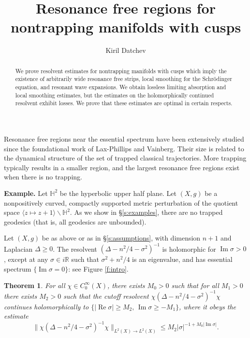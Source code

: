 \documentclass[reqno, 12pt]{amsart}
\title
[Resonance free regions for nontrapping manifolds with cusps]
{Resonance free regions for nontrapping manifolds with cusps}
\author[Kiril Datchev]
{Kiril Datchev}
\newcommand \R {\mathbb{R}}
\newcommand \Hh {\mathbb{H}}
\DeclareMathOperator \re {Re}
\DeclareMathOperator \im {Im}
\newtheorem*{thm}{Theorem}
\theoremstyle{definition}
\numberwithin{equation}{section}
\numberwithin{prop}{section}
\numberwithin{figure}{section}
\begin{document}
\begin{abstract}
We prove resolvent estimates for nontrapping manifolds with cusps which imply the existence of 
arbitrarily wide resonance free strips,  local smoothing for the Schr\"odinger equation, and resonant wave expansions. We obtain lossless limiting absorption and local smoothing estimates, %
but the estimates on the holomorphically continued resolvent exhibit losses. 
We prove that these estimates are optimal in certain respects.
\end{abstract}

\maketitle

\addtocounter{section}{1}
\thispagestyle{empty}

Resonance free regions near the essential spectrum have been extensively studied since the foundational work of Lax-Phillips and Vainberg. Their  size  is  related to the dynamical structure of the set of trapped classical trajectories. More trapping typically results in a smaller region, and the largest resonance free regions exist when there is no trapping.

\noindent \textbf{Example.} Let $\Hh^2$ be the hyperbolic upper half plane. Let $(X, g)$ be a nonpositively curved, compactly supported metric perturbation of the quotient space $\langle z \mapsto z+1 \rangle\backslash \Hh^2$. As we show in \S\ref{s:examples}, there are no trapped geodesics (that is, all geodesics are unbounded).

Let $(X,g)$ be as  above or as in \S \ref{s:assumptions}, with dimension $n+1$ and Laplacian $\Delta \ge 0 $. The resolvent $(\Delta - n^2/4 - \sigma^2)^{-1}$ is holomorphic for $\im \sigma > 0$, except at any $\sigma \in i \R$ such that $\sigma^2 + n^2/4$ is an eigenvalue, and has essential spectrum $\{\im \sigma = 0\}$: see Figure \ref{f:intro}. %

\begin{thm}
 For all $\chi \in C_0^\infty(X)$, there exists $M_0 > 0$ such that for all $M_1>0$ there exists $M_2 >0$ such that the cutoff resolvent $\chi (\Delta - n^2/4 - \sigma^2)^{-1} \chi$
continues holomorphically  to $\{|\re \sigma| \ge M_2,\, \im \sigma \ge - M_1\}$, where it obeys the estimate
\begin{equation}\label{logreg}
\|\chi (\Delta - n^2/4 - \sigma^2)^{-1} \chi\|_{L^2(X) \to L^2(X)} \le M_2|\sigma|^{-1 +M_0|\im \sigma|}.
\end{equation}
\end{thm}
\end{document}
